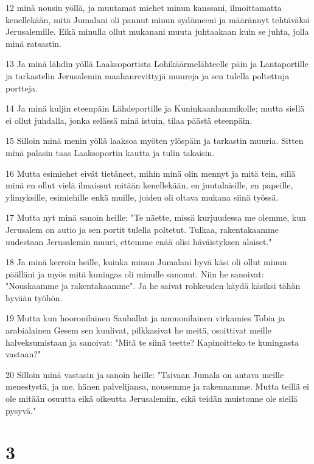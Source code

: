 \par 12 minä nousin yöllä, ja muutamat miehet minun kanssani, ilmoittamatta kenellekään, mitä Jumalani oli pannut minun sydämeeni ja määrännyt tehtäväksi Jerusalemille. Eikä minulla ollut mukanani muuta juhtaakaan kuin se juhta, jolla minä ratsastin.
\par 13 Ja minä lähdin yöllä Laaksoportista Lohikäärmelähteelle päin ja Lantaportille ja tarkastelin Jerusalemin maahanrevittyjä muureja ja sen tulella poltettuja portteja.
\par 14 Ja minä kuljin eteenpäin Lähdeportille ja Kuninkaanlammikolle; mutta siellä ei ollut juhdalla, jonka selässä minä istuin, tilaa päästä eteenpäin.
\par 15 Silloin minä menin yöllä laaksoa myöten ylöspäin ja tarkastin muuria. Sitten minä palasin taas Laaksoportin kautta ja tulin takaisin.
\par 16 Mutta esimiehet eivät tietäneet, mihin minä olin mennyt ja mitä tein, sillä minä en ollut vielä ilmaissut mitään kenellekään, en juutalaisille, en papeille, ylimyksille, esimiehille enkä muille, joiden oli oltava mukana siinä työssä.
\par 17 Mutta nyt minä sanoin heille: "Te näette, missä kurjuudessa me olemme, kun Jerusalem on autio ja sen portit tulella poltetut. Tulkaa, rakentakaamme uudestaan Jerusalemin muuri, ettemme enää olisi häväistyksen alaiset."
\par 18 Ja minä kerroin heille, kuinka minun Jumalani hyvä käsi oli ollut minun päälläni ja myös mitä kuningas oli minulle sanonut. Niin he sanoivat: "Nouskaamme ja rakentakaamme". Ja he saivat rohkeuden käydä käsiksi tähän hyvään työhön.
\par 19 Mutta kun hooronilainen Sanballat ja ammonilainen virkamies Tobia ja arabialainen Gesem sen kuulivat, pilkkasivat he meitä, osoittivat meille halveksumistaan ja sanoivat: "Mitä te siinä teette? Kapinoitteko te kuningasta vastaan?"
\par 20 Silloin minä vastasin ja sanoin heille: "Taivaan Jumala on antava meille menestystä, ja me, hänen palvelijansa, nousemme ja rakennamme. Mutta teillä ei ole mitään osuutta eikä oikeutta Jerusalemiin, eikä teidän muistonne ole siellä pysyvä."

\chapter{3}

